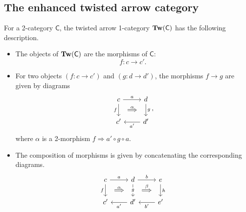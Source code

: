\documentclass[main.tex]{subfiles}
\begin{document}
\subsection{The enhanced twisted arrow category}
\label{ssc:the_twisted_arrow_category}

For a 2-category $\mathsf{C}$, the twisted arrow 1-category $\mathbf{Tw}(\mathsf{C})$ has the following description.
\begin{itemize}
  \item The objects of $\mathbf{Tw}(\mathsf{C})$ are the morphisms of $\mathsf{C}$:
    \begin{equation*}
      f\colon c \to c'.
    \end{equation*}

  \item For two objects $(f\colon c \to c')$ and $(g\colon d \to d')$, the morphisms $f \to g$ are given by diagrams
    \begin{equation*}
      \begin{tikzcd}
        c
        \arrow[r, "a"]
        \arrow[d, "f"{swap}, ""{name=L}]
        & d
        \arrow[d, "g", ""{name=R, swap}]
        \\
        c'
        & d'
        \arrow[l, "a'"]
        \arrow[from=L, to=R, Rightarrow, shorten=2ex, "\alpha"]
      \end{tikzcd},
    \end{equation*}
    where $\alpha$ is a 2-morphism $f \Rightarrow a' \circ g \circ a$.


  \item The composition of morphisms is given by concatenating the corresponding diagrams.
    \begin{equation*}
      \begin{tikzcd}
        c
        \arrow[r, "a"]
        \arrow[d, "f"{swap}, ""{name=L}]
        & d
        \arrow[d, "g"{description}, ""{name=LM}, ""{name=RM, swap}]
        \arrow[r, "b"]
        & e
        \arrow[d, "h", ""{name=R, swap}]
        \\
        c'
        & d'
        \arrow[l, "a'"]
        & e'
        \arrow[l, "b'"]
        \arrow[from=L, to=RM, Rightarrow, shorten=2ex, "\alpha"]
        \arrow[from=LM, to=R, Rightarrow, shorten=2ex, "\beta"]
      \end{tikzcd}
    \end{equation*}
\end{itemize}
\end{document}

